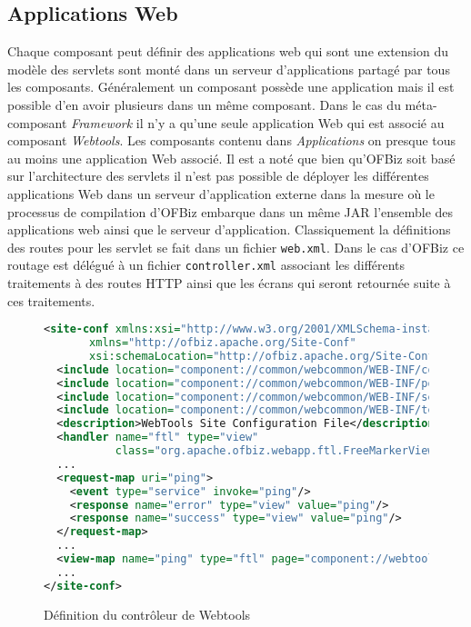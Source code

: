\documentclass[a4paper, 11pt]{report}
\begin{document}
\subsection{Applications Web}

Chaque composant peut définir des applications web qui sont une
extension du modèle des servlets sont monté dans un serveur
d'applications partagé par tous les composants. Généralement un
composant possède une application mais il est possible d'en avoir
plusieurs dans un même composant.  Dans le cas du méta-composant
\emph{Framework} il n'y a qu'une seule application Web qui est associé
au composant \emph{Webtools}. Les composants contenu dans
\emph{Applications} on presque tous au moins une application Web
associé.  Il est a noté que bien qu'OFBiz soit basé sur l'architecture
des servlets il n'est pas possible de déployer les différentes
applications Web dans un serveur d'application externe dans la mesure
où le processus de compilation d'OFBiz embarque dans un même JAR
l'ensemble des applications web ainsi que le serveur d'application.
Classiquement la définitions des routes pour les servlet se fait dans
un fichier \verb=web.xml=.  Dans le cas d'OFBiz ce routage est délégué
à un fichier \verb=controller.xml= associant les différents
traitements à des routes HTTP ainsi que les écrans qui seront
retournée suite à ces traitements.

\begin{figure}
  \begin{lstlisting}[language=xml]
<site-conf xmlns:xsi="http://www.w3.org/2001/XMLSchema-instance"
	   xmlns="http://ofbiz.apache.org/Site-Conf"
	   xsi:schemaLocation="http://ofbiz.apache.org/Site-Conf...">
  <include location="component://common/webcommon/WEB-INF/common-controller.xml"/>
  <include location="component://common/webcommon/WEB-INF/portal-controller.xml"/>
  <include location="component://common/webcommon/WEB-INF/security-controller.xml"/>
  <include location="component://common/webcommon/WEB-INF/tempexpr-controller.xml"/>
  <description>WebTools Site Configuration File</description>
  <handler name="ftl" type="view"
           class="org.apache.ofbiz.webapp.ftl.FreeMarkerViewHandler"/>
  ...
  <request-map uri="ping">
    <event type="service" invoke="ping"/>
    <response name="error" type="view" value="ping"/>
    <response name="success" type="view" value="ping"/>
  </request-map>
  ...
  <view-map name="ping" type="ftl" page="component://webtools/template/Ping.ftl"/>
  ...
</site-conf>
  \end{lstlisting}
  \caption{Définition du contrôleur de Webtools}
  \label{fig:controller}
\end{figure}
\end{document}
